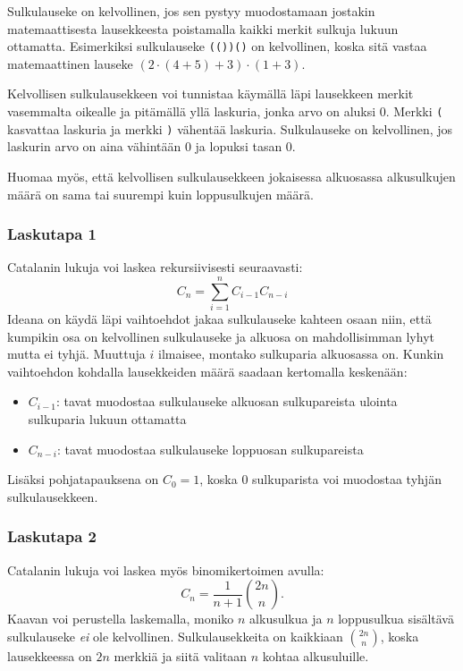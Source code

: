 Sulkulauseke on kelvollinen, jos sen pystyy
muodostamaan jostakin
matemaattisesta lausekkeesta poistamalla
kaikki merkit sulkuja lukuun ottamatta.
Esimerkiksi sulkulauseke \texttt{(())()}
on kelvollinen, koska sitä vastaa
matemaattinen lauseke $(2 \cdot (4+5)+3)\cdot(1+3)$.

Kelvollisen sulkulausekkeen voi tunnistaa käymällä
läpi lausekkeen merkit vasemmalta oikealle ja
pitämällä yllä laskuria, jonka arvo on aluksi 0.
Merkki \texttt{(} kasvattaa laskuria ja
merkki \texttt{)} vähentää laskuria.
Sulkulauseke on kelvollinen, jos laskurin arvo
on aina vähintään 0 ja lopuksi tasan 0.

Huomaa myös, että kelvollisen sulkulausekkeen
jokaisessa alkuosassa alkusulkujen määrä on
sama tai suurempi kuin loppusulkujen määrä.

\subsubsection{Laskutapa 1}

Catalanin lukuja voi laskea rekursiivisesti seuraavasti:
\[ C_n = \sum_{i=1}^{n} C_{i-1} C_{n-i}\]
Ideana on käydä läpi vaihtoehdot
jakaa sulkulauseke kahteen osaan niin,
että kumpikin osa on kelvollinen sulkulauseke
ja alkuosa on mahdollisimman lyhyt mutta ei tyhjä.
Muuttuja $i$ ilmaisee, montako sulkuparia
alkuosassa on.
Kunkin vaihtoehdon kohdalla lausekkeiden määrä
saadaan kertomalla keskenään:

\begin{itemize}
\item $C_{i-1}$: tavat muodostaa sulkulauseke
alkuosan sulkupareista ulointa sulkuparia lukuun ottamatta
\item $C_{n-i}$: tavat muodostaa sulkulauseke
loppuosan sulkupareista
\end{itemize}
Lisäksi pohjatapauksena on $C_0=1$, koska 0
sulkuparista voi muodostaa
tyhjän sulkulausekkeen.

\subsubsection{Laskutapa 2}

Catalanin lukuja voi laskea myös binomikertoimen avulla:
\[ C_n = \frac{1}{n+1} {2n \choose n}. \]
Kaavan voi perustella laskemalla, moniko $n$ alkusulkua
ja $n$ loppusulkua sisältävä sulkulauseke \textit{ei}
ole kelvollinen.
Sulkulausekkeita on kaikkiaan ${2n \choose n}$,
koska lausekkeessa on $2n$ merkkiä ja siitä valitaan
$n$ kohtaa alkusuluille.

